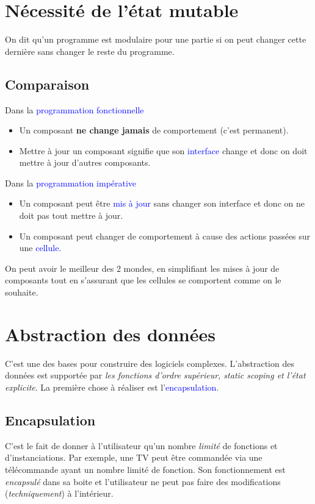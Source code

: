 \documentclass{report}
\begin{document}
\section{Nécessité de l'état mutable}
On dit qu'un programme est modulaire pour une partie si on peut changer cette dernière sans changer le reste du programme.

\subsection{Comparaison}
\noindent
Dans la \textcolor{blue}{programmation fonctionnelle}
\begin{itemize}
\item Un composant \textbf{ne change jamais} de comportement (c'est permanent).
\item Mettre à jour un composant signifie que son \textcolor{blue}{interface} change et donc on doit mettre à jour d'autres composants.
\end{itemize}
Dans la \textcolor{blue}{programmation impérative}
\begin{itemize}
\item Un composant peut être \textcolor{blue}{mis à jour} sans changer son interface et donc on ne doit pas tout mettre à jour.
\item Un composant peut changer de comportement à cause des actions passées sur une \textcolor{blue}{cellule}.
\end{itemize}
On peut avoir le meilleur des 2 mondes, en simplifiant les mises à jour de composants tout en s'assurant que les cellules se comportent comme on le souhaite.

\section{Abstraction des données}
C'est une des bases pour construire des logiciels complexes. L'abstraction des données est supportée par \textit{les fonctions d'ordre supérieur, static scoping et l'état explicite}. La première chose à réaliser est l'\textcolor{blue}{encapsulation}.

\subsection{Encapsulation}
C'est le fait de donner à l'utilisateur qu'un nombre \textit{limité} de fonctions et d'instanciations. Par exemple, une TV peut être commandée via une télécommande ayant un nombre limité de fonction. Son fonctionnement est \textit{encapsulé} dans sa boite et l'utilisateur ne peut pas faire des modifications (\textit{techniquement}) à l'intérieur.
\end{document}
